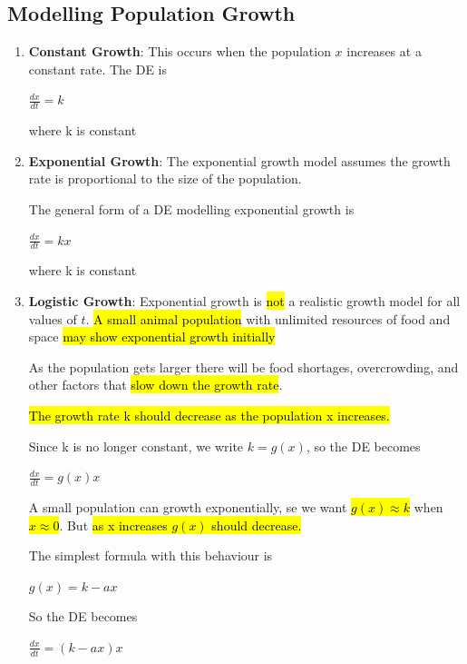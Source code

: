 \documentclass{article}
\begin{document}
    \subsection{Modelling Population Growth}
      \begin{enumerate}
        \item \textbf{Constant Growth}: This occurs when the population $x$ increases at a constant rate. The DE is 
          \begin{center}
            $\frac{dx}{dt} = k$
          \end{center}
          where k is constant

        \item \textbf{Exponential Growth}: The exponential growth model assumes the growth rate is proportional to the size of the population.

        The general form of a DE modelling exponential growth is 
          \begin{center}
            $\frac{dx}{dt} = kx$
          \end{center}
          where k is constant

        \item \textbf{Logistic Growth}: Exponential growth is \hl{not} a realistic growth model for all values of $t$. \hl{A small animal population} with unlimited resources of food and space \hl{may show exponential growth initially}

        As the population gets larger there will be food shortages, overcrowding, and other factors that \hl{slow down the growth rate}.

        \hl{The growth rate k should decrease as the population x increases.}

        Since k is no longer constant, we write $k=g(x)$, so the DE becomes 
          \begin{center}
            $\frac{dx}{dt} = g(x)x$
          \end{center}

        A small population can growth exponentially, se we want \hl{$g(x) \approx k$} when \hl{$x \approx 0$}. But \hl{as x increases $g(x)$ should decrease.}

        The simplest formula with this behaviour is 
          \begin{center}
            $g(x) = k - ax$
          \end{center}

        So the DE becomes 
          \begin{center}
            $\frac{dx}{dt} = (k-ax)x$
          \end{center}


\end{enumerate}
\end{document}
